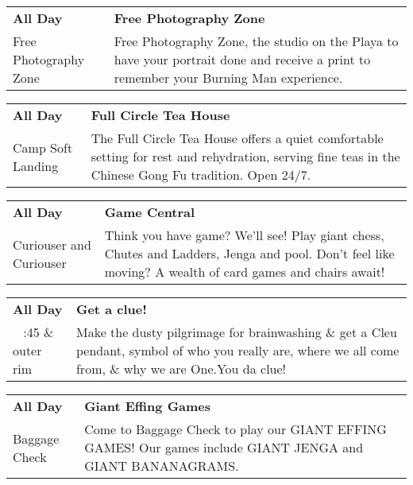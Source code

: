 \begin{tabular}{ p{1in} p{2.2in} }
    \textbf{All Day} & \textbf{Free Photography Zone} \\
    Free Photography Zone \newline  & Free Photography Zone, the studio on the Playa to have your portrait done and receive a print to remember your Burning Man experience. \\
    \hline 
\end{tabular}
    
\begin{tabular}{ p{1in} p{2.2in} }
    \textbf{All Day} & \textbf{Full Circle Tea House} \\
    Camp Soft Landing \newline  & The Full Circle Tea House offers a quiet comfortable setting for rest and rehydration, serving fine teas in the Chinese Gong Fu tradition. Open 24/7. \\
    \hline 
\end{tabular}
    
\begin{tabular}{ p{1in} p{2.2in} }
    \textbf{All Day} & \textbf{Game Central} \\
    Curiouser and Curiouser \newline  & Think you have game? We'll see! Play giant chess, Chutes and Ladders, Jenga and pool. Don't feel like moving? A wealth of card games and chairs await! \\
    \hline 
\end{tabular}
    
\begin{tabular}{ p{1in} p{2.2in} }
    \textbf{All Day} & \textbf{Get a clue!} \\
    ~ \newline 3:45 \& outer rim & Make the dusty pilgrimage for brainwashing \& get a Cleu pendant, symbol of who you really are, where we all come from, \& why we are One.You da clue! \\
    \hline 
\end{tabular}
    
\begin{tabular}{ p{1in} p{2.2in} }
    \textbf{All Day} & \textbf{Giant Effing Games} \\
    Baggage Check \newline  & Come to Baggage Check to play our GIANT EFFING GAMES! Our games include GIANT JENGA and GIANT BANANAGRAMS. \\
    \hline 
\end{tabular}
    
